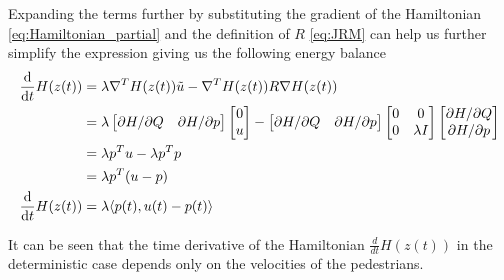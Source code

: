 Expanding the terms further by substituting the gradient of the Hamiltonian \autoref{eq:Hamiltonian_partial} and the definition of $R$ \autoref{eq:JRM} can help us further simplify the expression giving us the following energy balance
\begin{align}
    \dfrac{\mathrm d }{\mathrm d t}H(z(t)) &= \lambda \nabla^T H(z(t)) \tilde u - \nabla^T H(z(t)) R \nabla H(z(t)) \nonumber \\
    &\begin{aligned}
        &= \lambda 
        \begin{bmatrix}
        \partial H / \partial Q & \partial H / \partial p
        \end{bmatrix}
        \begin{bmatrix}
            0 \\
            u
        \end{bmatrix}
        - 
        \begin{bmatrix}
        \partial H / \partial Q & \partial H / \partial p
        \end{bmatrix}
        \begin{bmatrix}
            0 & 0 \\ 0 & \lambda I
        \end{bmatrix}
        \begin{bmatrix}
        \partial H / \partial Q \\ \partial H / \partial p
        \end{bmatrix}  \\ 
        &= \lambda p^T u - \lambda  p^T p \\ 
        &= \lambda p^T (u - p) \\ 
    \end{aligned} \nonumber \\
    \dfrac{\mathrm d }{\mathrm d t}H(z(t))&= \lambda \langle p(t),u(t)-p(t) \rangle
    \label{eq:dH}
\end{align}


It can be seen that the time derivative of the Hamiltonian $\frac{d}{dt}H(z(t))$ in the deterministic case depends only on the velocities of the pedestrians.

